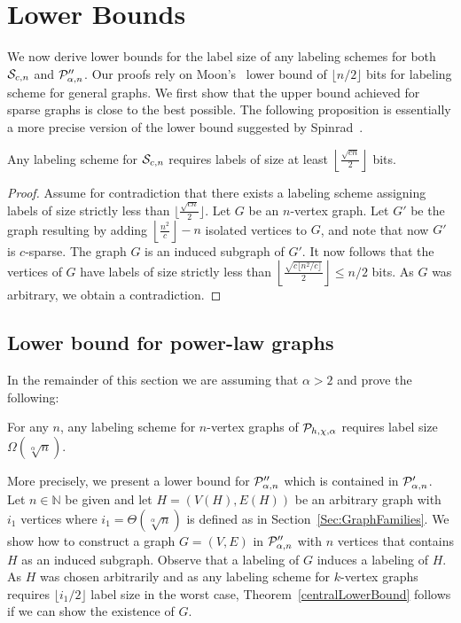 
\section{Lower Bounds}
We now derive lower bounds for the label size of any  labeling schemes for both $ \mathcal{S}_{c,n}$ and  $ \mathcal{P}''_{\alpha,n}$.
Our proofs rely on  Moon's~\cite{moon1965minimal} lower bound of  $\lfloor n/2 \rfloor$ bits for labeling scheme for general graphs.
We first show that the upper bound achieved for sparse graphs is close to the best possible.
The following proposition is essentially a more precise version of the lower bound suggested by Spinrad~\cite{spinrad2003efficient}.
\begin{proposition}
Any  labeling scheme for $ \mathcal{S}_{c,n}$ requires  labels of size at least $\left\lfloor\frac{\sqrt{cn}}2\right\rfloor$ bits.
\end{proposition}
\begin{proof}
Assume for contradiction that there exists a labeling scheme  assigning labels of size strictly less than $\lfloor\frac{\sqrt{cn}}2\rfloor$.
Let $G$ be an $n$-vertex graph. Let $G'$ be the graph resulting by adding $\left\lfloor\frac{n^2}{c}\right\rfloor - n$ isolated vertices to $G$, and note that now $G'$ is $c$-sparse. The graph $G$ is an induced subgraph of  $G'$.
It now follows that the vertices of $G$ have  labels of size strictly less than 
$\left\lfloor\frac{\sqrt{c\lfloor n^2/c\rfloor}}2\right\rfloor \leq n/2$ bits. As $G$ was arbitrary, we obtain a contradiction.
\end{proof}

\subsection{Lower bound for power-law graphs}
In the remainder of this section we are assuming that $\alpha>2$ and  prove the following:
\begin{theorem}\label{centralLowerBound}
For any $n$, any labeling scheme for $n$-vertex graphs of $ \mathcal{P}_{h,\chi,\alpha}$ requires label size $\Omega(\sqrt[\alpha]{n})$.
\end{theorem}
More precisely, we present a lower bound for $ \mathcal{P}''_{\alpha,n}$ which is contained in $ \mathcal{P}'_{\alpha,n}$. Let $n\in\mathbb N$ be given and let $H = (V(H),E(H))$ be an arbitrary graph with $i_1$ vertices where $i_1 = \Theta(\sqrt[\alpha]n)$ is defined as in Section~\ref{Sec:GraphFamilies}. We show how to construct a graph $G = (V,E)$ in $ \mathcal{P}''_{\alpha,n}$ with $n$ vertices that contains $H$ as an induced subgraph. Observe that a labeling of $G$ induces a labeling of $H$. As $H$ was chosen arbitrarily and as any labeling scheme for $k$-vertex graphs requires $\lfloor i_1/2 \rfloor$ label size in the worst case, Theorem~\ref{centralLowerBound} follows if we can show the existence of $G$.

